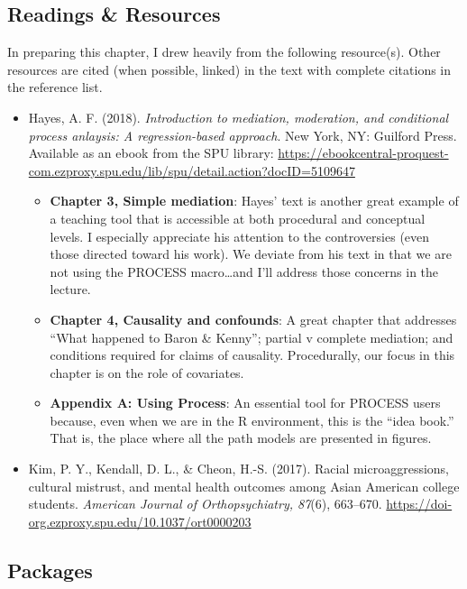 \documentclass[
  11pt,
]{book}
\providecommand{\tightlist}{%
  \setlength{\itemsep}{0pt}\setlength{\parskip}{0pt}}
\begin{document}
\hypertarget{readings-resources-4}{%
\subsection{Readings \& Resources}\label{readings-resources-4}}

In preparing this chapter, I drew heavily from the following resource(s). Other resources are cited (when possible, linked) in the text with complete citations in the reference list.

\begin{itemize}
\tightlist
\item
  Hayes, A. F. (2018). \emph{Introduction to mediation, moderation, and conditional process anlaysis: A regression-based approach}. New York, NY: Guilford Press. Available as an ebook from the SPU library: \url{https://ebookcentral-proquest-com.ezproxy.spu.edu/lib/spu/detail.action?docID=5109647}

  \begin{itemize}
  \tightlist
  \item
    \textbf{Chapter 3, Simple mediation}: Hayes' text is another great example of a teaching tool that is accessible at both procedural and conceptual levels. I especially appreciate his attention to the controversies (even those directed toward his work). We deviate from his text in that we are not using the PROCESS macro\ldots and I'll address those concerns in the lecture.
  \item
    \textbf{Chapter 4, Causality and confounds}: A great chapter that addresses ``What happened to Baron \& Kenny''; partial v complete mediation; and conditions required for claims of causality. Procedurally, our focus in this chapter is on the role of covariates.
  \item
    \textbf{Appendix A: Using Process}: An essential tool for PROCESS users because, even when we are in the R environment, this is the ``idea book.'' That is, the place where all the path models are presented in figures.
  \end{itemize}
\item
  Kim, P. Y., Kendall, D. L., \& Cheon, H.-S. (2017). Racial microaggressions, cultural mistrust, and mental health outcomes among Asian American college students. \emph{American Journal of Orthopsychiatry, 87}(6), 663--670. \url{https://doi-org.ezproxy.spu.edu/10.1037/ort0000203}
\end{itemize}

\hypertarget{packages-5}{%
\subsection{Packages}\label{packages-5}}
\end{document}
